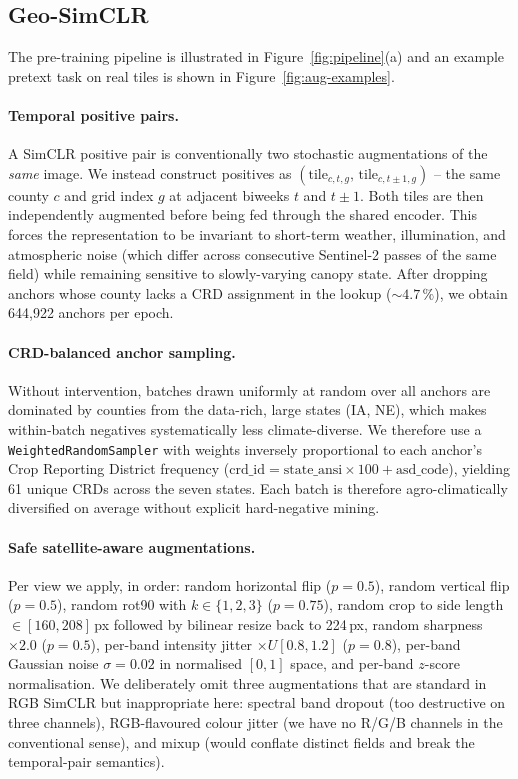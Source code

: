 \documentclass{article}
\begin{document}
\subsection{Geo-SimCLR}
The pre-training pipeline is illustrated in Figure~\ref{fig:pipeline}(a) and an
example pretext task on real tiles is shown in Figure~\ref{fig:aug-examples}.

\paragraph{Temporal positive pairs.}
A SimCLR positive pair is conventionally two stochastic augmentations of the
\emph{same} image. We instead construct positives as
\((\mathrm{tile}_{c,t,g},\,\mathrm{tile}_{c,t \pm 1,g})\) -- the same county
$c$ and grid index $g$ at adjacent biweeks $t$ and $t\pm 1$. Both tiles are
then independently augmented before being fed through the shared encoder. This
forces the representation to be invariant to short-term weather, illumination,
and atmospheric noise (which differ across consecutive Sentinel-2 passes of
the same field) while remaining sensitive to slowly-varying canopy state.
After dropping anchors whose county lacks a CRD assignment in the lookup
($\sim 4.7\,\%$), we obtain 644{,}922 anchors per epoch.

\paragraph{CRD-balanced anchor sampling.}
Without intervention, batches drawn uniformly at random over all anchors are
dominated by counties from the data-rich, large states (IA, NE), which makes
within-batch negatives systematically less climate-diverse. We therefore use a
\texttt{WeightedRandomSampler} with weights inversely proportional to each
anchor's Crop Reporting District frequency
($\mathrm{crd\_id} = \mathrm{state\_ansi} \times 100 + \mathrm{asd\_code}$),
yielding 61 unique CRDs across the seven states. Each batch is therefore
agro-climatically diversified on average without explicit hard-negative mining.

\paragraph{Safe satellite-aware augmentations.}
Per view we apply, in order: random horizontal flip ($p=0.5$), random vertical
flip ($p=0.5$), random rot90 with $k\!\in\!\{1,2,3\}$ ($p=0.75$), random crop
to side length $\in [160, 208]$\,px followed by bilinear resize back to 224\,px,
random sharpness $\times 2.0$ ($p=0.5$), per-band intensity jitter $\times
U[0.8,1.2]$ ($p=0.8$), per-band Gaussian noise $\sigma=0.02$ in normalised
$[0,1]$ space, and per-band $z$-score normalisation. We deliberately omit
three augmentations that are standard in RGB SimCLR but inappropriate here:
spectral band dropout (too destructive on three channels), RGB-flavoured
colour jitter (we have no R/G/B channels in the conventional sense), and mixup
(would conflate distinct fields and break the temporal-pair semantics).
\end{document}
